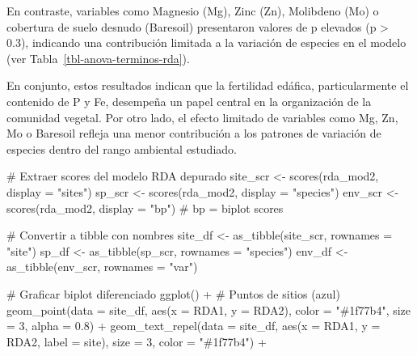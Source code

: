 \documentclass[
  spanish,
  11pt,
  a4paper,
  DIV=11,
  numbers=noendperiod]{scrartcl}
\newenvironment{Shaded}{\begin{snugshade}}{\end{snugshade}}
\newcommand{\AttributeTok}[1]{\textcolor[rgb]{0.40,0.45,0.13}{#1}}
\newcommand{\CommentTok}[1]{\textcolor[rgb]{0.37,0.37,0.37}{#1}}
\newcommand{\DecValTok}[1]{\textcolor[rgb]{0.68,0.00,0.00}{#1}}
\newcommand{\FloatTok}[1]{\textcolor[rgb]{0.68,0.00,0.00}{#1}}
\newcommand{\FunctionTok}[1]{\textcolor[rgb]{0.28,0.35,0.67}{#1}}
\newcommand{\NormalTok}[1]{\textcolor[rgb]{0.00,0.23,0.31}{#1}}
\newcommand{\OtherTok}[1]{\textcolor[rgb]{0.00,0.23,0.31}{#1}}
\newcommand{\SpecialCharTok}[1]{\textcolor[rgb]{0.37,0.37,0.37}{#1}}
\newcommand{\StringTok}[1]{\textcolor[rgb]{0.13,0.47,0.30}{#1}}
\begin{document}
En contraste, variables como Magnesio (Mg), Zinc (Zn), Molibdeno (Mo) o
cobertura de suelo desnudo (Baresoil) presentaron valores de p elevados
(p \textgreater{} 0.3), indicando una contribución limitada a la
variación de especies en el modelo (ver
Tabla~\ref{tbl-anova-terminos-rda}).

En conjunto, estos resultados indican que la fertilidad edáfica,
particularmente el contenido de P y Fe, desempeña un papel central en la
organización de la comunidad vegetal. Por otro lado, el efecto limitado
de variables como Mg, Zn, Mo o Baresoil refleja una menor contribución a
los patrones de variación de especies dentro del rango ambiental
estudiado.

\begin{Shaded}
\begin{Highlighting}[numbers=left,,]
\CommentTok{\# Extraer scores del modelo RDA depurado}
\NormalTok{site\_scr }\OtherTok{\textless{}{-}} \FunctionTok{scores}\NormalTok{(rda\_mod2, }\AttributeTok{display =} \StringTok{"sites"}\NormalTok{)}
\NormalTok{sp\_scr   }\OtherTok{\textless{}{-}} \FunctionTok{scores}\NormalTok{(rda\_mod2, }\AttributeTok{display =} \StringTok{"species"}\NormalTok{)}
\NormalTok{env\_scr  }\OtherTok{\textless{}{-}} \FunctionTok{scores}\NormalTok{(rda\_mod2, }\AttributeTok{display =} \StringTok{"bp"}\NormalTok{)  }\CommentTok{\# bp = biplot scores }

\CommentTok{\# Convertir a tibble con nombres}
\NormalTok{site\_df }\OtherTok{\textless{}{-}} \FunctionTok{as\_tibble}\NormalTok{(site\_scr, }\AttributeTok{rownames =} \StringTok{"site"}\NormalTok{)}
\NormalTok{sp\_df   }\OtherTok{\textless{}{-}} \FunctionTok{as\_tibble}\NormalTok{(sp\_scr, }\AttributeTok{rownames =} \StringTok{"species"}\NormalTok{)}
\NormalTok{env\_df  }\OtherTok{\textless{}{-}} \FunctionTok{as\_tibble}\NormalTok{(env\_scr, }\AttributeTok{rownames =} \StringTok{"var"}\NormalTok{)}

\CommentTok{\# Graficar biplot diferenciado}
\FunctionTok{ggplot}\NormalTok{() }\SpecialCharTok{+}
  \CommentTok{\# Puntos de sitios (azul)}
  \FunctionTok{geom\_point}\NormalTok{(}\AttributeTok{data =}\NormalTok{ site\_df, }\FunctionTok{aes}\NormalTok{(}\AttributeTok{x =}\NormalTok{ RDA1, }\AttributeTok{y =}\NormalTok{ RDA2), }\AttributeTok{color =} \StringTok{"\#1f77b4"}\NormalTok{, }
             \AttributeTok{size =} \DecValTok{3}\NormalTok{, }\AttributeTok{alpha =} \FloatTok{0.8}\NormalTok{) }\SpecialCharTok{+}
  \FunctionTok{geom\_text\_repel}\NormalTok{(}\AttributeTok{data =}\NormalTok{ site\_df, }\FunctionTok{aes}\NormalTok{(}\AttributeTok{x =}\NormalTok{ RDA1, }\AttributeTok{y =}\NormalTok{ RDA2, }\AttributeTok{label =}\NormalTok{ site), }
                  \AttributeTok{size =} \DecValTok{3}\NormalTok{, }\AttributeTok{color =} \StringTok{"\#1f77b4"}\NormalTok{) }\SpecialCharTok{+}
  

\end{Highlighting}
\end{Shaded}
\end{document}
